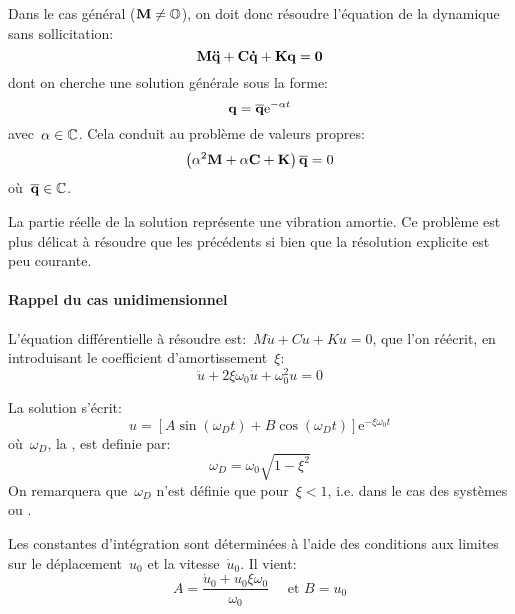 Dans le cas général ($\MM{M}\ne\MM{\mO}$), on doit donc résoudre l'équation de la dynamique sans sollicitation:
\begin{equation} \MM{M}\VV{\ddot{q}}+\MM{C}\VV{\dot{q}}+\MM{K}\VV{q}=\VV{0} \end{equation}
dont on cherche une solution générale sous la forme:
\begin{equation} \VV{q}=\VV{\overline{q}}\mathrm{e}^{-\alpha t} \end{equation}
avec~$\alpha\in\mathbb C$.
Cela conduit au problème de valeurs propres:
\begin{equation} \left(\alpha^2\MM{M}+\alpha\MM{C}+\MM{K}\right)\VV{\overline{q}}=0\end{equation}
où~$\VV{\overline{q}}\in\CC$.

La partie réelle de la solution représente une vibration amortie. Ce problème est plus délicat à résoudre que les précédents si bien que la résolution explicite est peu courante.

\medskip
{}
\paragraph{Rappel du cas unidimensionnel}
L'équation différentielle à résoudre est:~$M\ddot{u}+C\dot{u}+Ku=0$, que l'on
réécrit, en introduisant le coefficient d'amortissement~$\xi$:
\begin{equation}\ddot{u}+2\xi\omega_0\dot{u}+\omega^2_0 u=0\end{equation}

La solution s'écrit: \begin{equation} u=\left[A\sin (\omega_D t)+B\cos(\omega_D t)\right] \mathrm{e}^{-\xi\omega_0t} \end{equation}
où~$\omega_D$, la , est definie par:
\begin{equation}\omega_D=\omega_0\sqrt{1-\xi^2}\end{equation}
On remarquera que~$\omega_D$ n'est définie que pour~$\xi<1$, i.e.
dans le cas des systèmes  ou .

Les constantes d'intégration sont déterminées à l'aide des conditions aux limites sur le déplacement~$u_0$ et la
vitesse~$\dot{u}_0$. Il vient: \begin{equation} A=\dfrac{\dot{u}_0+u_0\xi\omega_0}{\omega_0} \quad \text{ et } B=u_0\end{equation}

